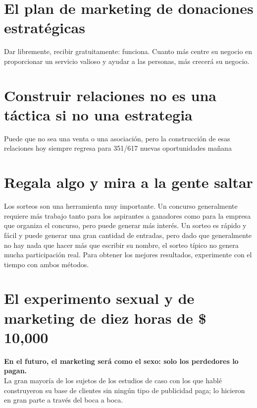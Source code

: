 \documentclass[10pt]{book}
\begin{document}
    \section{El plan de marketing de donaciones estratégicas}
	Dar libremente, recibir gratuitamente: funciona. Cuanto más centre su negocio en proporcionar un servicio valioso y ayudar a las personas, más crecerá su negocio.

    \section{Construir relaciones no es una táctica si no una estrategia}
	Puede que no sea una venta o una asociación, pero la construcción de esas relaciones hoy siempre regresa para 351/617 nuevas oportunidades mañana

    \section{Regala algo y mira a la gente saltar}
	Los sorteos son una herramienta muy importante. Un concurso generalmente requiere más trabajo tanto para los aspirantes a ganadores como para la empresa que organiza el concurso, pero puede generar más interés. Un sorteo es rápido y fácil y puede generar una gran cantidad de entradas, pero dado que generalmente no hay nada que hacer más que escribir su nombre, el sorteo típico no genera mucha participación real. Para obtener los mejores resultados, experimente con el tiempo con ambos métodos.

    \section{El experimento sexual y de marketing de diez horas de \$ 10,000}
    \textbf{En el futuro, el marketing será como el sexo: solo los perdedores lo pagan.}\\
    La gran mayoría de los sujetos de los estudios de caso con los que hablé construyeron su base de clientes sin ningún tipo de publicidad paga; lo hicieron en gran parte a través del boca a boca.
\end{document}

